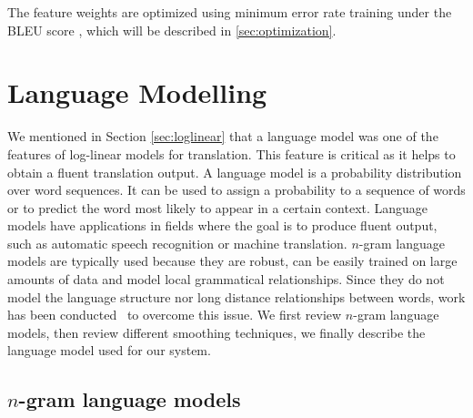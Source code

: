     The feature weights are optimized using minimum error rate training \cite{och:2003:ACL} under the BLEU 
    score \cite{papineni-roukos-ward-zhu:2002:ACL}, which will be described
    in \autoref{sec:optimization}.

\section{Language Modelling}
\label{sec:languageModelling}



We mentioned in Section \ref{sec:loglinear} that a language model was one of the features of
    log-linear models for translation. This feature is critical as it helps to obtain a fluent
    translation output. A language model is a probability distribution over word sequences. It can be used to assign
    a probability to a sequence of words or to predict the word most likely to appear in a certain context.
    Language models have applications in fields where the goal is to produce fluent output, such
    as automatic speech recognition or machine translation.
    $n$-gram language models are typically used because they are 
    robust, can be easily trained on large amounts of data and model local grammatical relationships.
    Since they do not model the language structure nor long distance relationships between words, work
    has been conducted~\citep{shen-xu-weischedel:2008:ACL} to overcome this issue.
    We first review $n$-gram language models, then review different smoothing techniques, we finally
    describe the language model used for our system.

\subsection{$n$-gram language models}
\label{sec:ngramLanguageModels}

